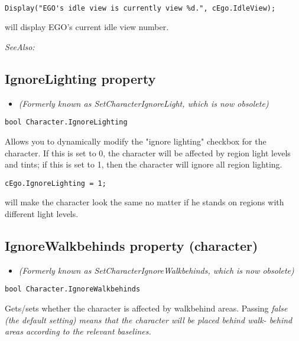 \begin{verbatim}

Display("EGO's idle view is currently view %d.", cEgo.IdleView);
\end{verbatim}
will display EGO's current idle view number.

\it{SeeAlso:} 


\subsection{IgnoreLighting property}\label{Character.IgnoreLighting}%

\begin{itemize}
\item \it{(Formerly known as SetCharacterIgnoreLight, which is now obsolete)}
\end{itemize}

\begin{verbatim}
bool Character.IgnoreLighting
\end{verbatim}
Allows you to dynamically modify the "ignore lighting" checkbox for the
character. If this is set to 0, the character will be affected by region light
levels and tints; if this is set to 1, then the character will ignore all
region lighting.

\begin{verbatim}
cEgo.IgnoreLighting = 1;
\end{verbatim}
will make the character look the same no matter if he stands on regions with
different light levels.


\subsection{IgnoreWalkbehinds property (character)}\label{Character.IgnoreWalkbehinds}%

\begin{itemize}
\item \it{(Formerly known as SetCharacterIgnoreWalkbehinds, which is now obsolete)}
\end{itemize}

\begin{verbatim}
bool Character.IgnoreWalkbehinds
\end{verbatim}
Gets/sets whether the character is affected by walkbehind areas. Passing \it{false}
(the default setting) means that the character will be placed behind walk-
behind areas according to the relevant baselines.

